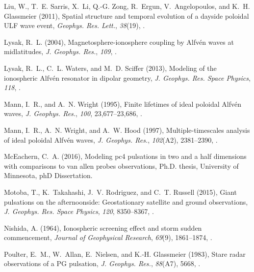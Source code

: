 \documentclass[draft,linenumbers]{agujournal}
\begin{document}
\begin{thebibliography}{50}
Liu, W., T.~E. Sarris, X.~Li, Q.-G. Zong, R.~Ergun, V.~Angelopoulos, and K.~H.
  Glassmeier (2011), Spatial structure and temporal evolution of a dayside
  poloidal {ULF} wave event, \textit{Geophys. Res. Lett.}, \textit{38}(19),
  .

Lysak, R.~L. (2004), Magnetosphere-ionosphere coupling by {Alfv{\'e}n} waves at
  midlatitudes, \textit{J. Geophys. Res.}, \textit{109},
  .

Lysak, R.~L., C.~L. Waters, and M.~D. Sciffer (2013), Modeling of the
  ionospheric {Alfv{\'e}n} resonator in dipolar geometry, \textit{J. Geophys.
  Res. Space Physics}, \textit{118}, .

Mann, I.~R., and A.~N. Wright (1995), Finite lifetimes of ideal poloidal
  {Alfv{\'e}n} waves, \textit{J. Geophys. Res.}, \textit{100}, 23,677--23,686,
  .

Mann, I.~R., A.~N. Wright, and A.~W. Hood (1997), Multiple-timescales analysis
  of ideal poloidal {Alfv{\'e}n} waves, \textit{J. Geophys. Res.},
  \textit{102}(A2), 2381--2390, .

McEachern, C.~A. (2016), Modeling pc4 pulsations in two and a half dimensions
  with comparisons to van allen probes observations, Ph.D. thesis, University
  of Minnesota, phD Dissertation.

Motoba, T., K.~Takahashi, J.~V. Rodriguez, and C.~T. Russell (2015), Giant
  pulsations on the afternoonside: Geostationary satellite and ground
  observations, \textit{J. Geophys. Res. Space Physics}, \textit{120},
  8350--8367, .

Nishida, A. (1964), Ionospheric screening effect and storm sudden commencement,
  \textit{Journal of Geophysical Research}, \textit{69}(9), 1861--1874,
  .

Poulter, E.~M., W.~Allan, E.~Nielsen, and K.-H. Glassmeier (1983), Stare radar
  observations of a {PG} pulsation, \textit{J. Geophys. Res.}, \textit{88}(A7),
  5668, .


\end{thebibliography}
\end{document}
